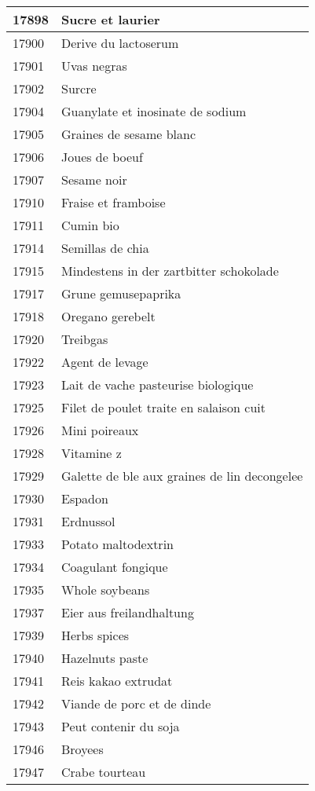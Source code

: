 \begin{longtable}{|l|l|}
17898 & Sucre et laurier \\ \hline 
17900 & Derive du lactoserum \\ \hline 
17901 & Uvas negras \\ \hline 
17902 & Surcre \\ \hline 
17904 & Guanylate et inosinate de sodium \\ \hline 
17905 & Graines de sesame blanc \\ \hline 
17906 & Joues de boeuf \\ \hline 
17907 & Sesame noir \\ \hline 
17910 & Fraise et framboise \\ \hline 
17911 & Cumin bio \\ \hline 
17914 & Semillas de chia \\ \hline 
17915 & Mindestens in der zartbitter schokolade \\ \hline 
17917 & Grune gemusepaprika \\ \hline 
17918 & Oregano gerebelt \\ \hline 
17920 & Treibgas \\ \hline 
17922 & Agent de levage \\ \hline 
17923 & Lait de vache pasteurise biologique \\ \hline 
17925 & Filet de poulet traite en salaison cuit \\ \hline 
17926 & Mini poireaux \\ \hline 
17928 & Vitamine z \\ \hline 
17929 & Galette de ble aux graines de lin decongelee \\ \hline 
17930 & Espadon \\ \hline 
17931 & Erdnussol \\ \hline 
17933 & Potato maltodextrin \\ \hline 
17934 & Coagulant fongique \\ \hline 
17935 & Whole soybeans \\ \hline 
17937 & Eier aus freilandhaltung \\ \hline 
17939 & Herbs spices \\ \hline 
17940 & Hazelnuts paste \\ \hline 
17941 & Reis kakao extrudat \\ \hline 
17942 & Viande de porc et de dinde \\ \hline 
17943 & Peut contenir du soja \\ \hline 
17946 & Broyees \\ \hline 
17947 & Crabe tourteau \\ \hline 

\end{longtable}
